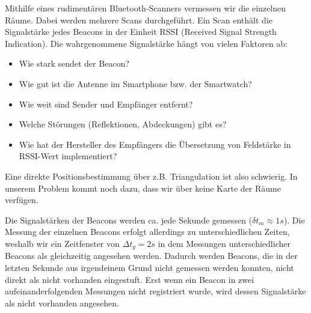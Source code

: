 Mithilfe eines rudimentären Bluetooth-Scanners vermessen wir die einzelnen Räume.
Dabei werden mehrere Scans durchgeführt. Ein Scan enthält die Signalstärke 
jedes Beacons in der Einheit RSSI (Received Signal Strength Indication).
Die wahrgenommene Signalstärke hängt von vielen Faktoren ab:
\begin{itemize}
	\item Wie stark sendet der Beacon?
	\item Wie gut ist die Antenne im Smartphone bzw. der Smartwatch?
	\item Wie weit sind Sender und Empfänger entfernt?
	\item Welche Störungen (Reflektionen, Abdeckungen) gibt es?
	\item Wie hat der Hersteller des Empfängers die Übersetzung von Feldstärke in RSSI-Wert implementiert?
\end{itemize}
Eine direkte Positionsbestimmung über z.B. Triangulation ist also schwierig.
In unserem Problem kommt noch dazu, dass wir über keine Karte der Räume
verfügen.

Die Signalstärken der Beacons werden ca. jede Sekunde gemessen ($\delta t_m \approx 1s$).
Die Messung der einzelnen Beacons erfolgt allerdings zu unterschiedlichen Zeiten,
weshalb wir ein Zeitfenster von $\Delta t_g = 2s$ in dem Messungen unterschiedlicher
Beacons als gleichzeitig angesehen werden. Dadurch werden Beacons, die in der letzten Sekunde aus irgendeinem Grund nicht gemessen werden konnten, nicht direkt als nicht vorhanden eingestuft.
Erst wenn ein Beacon in zwei aufeinanderfolgenden Messungen nicht registriert wurde, wird dessen Signalstärke als nicht vorhanden angesehen.

